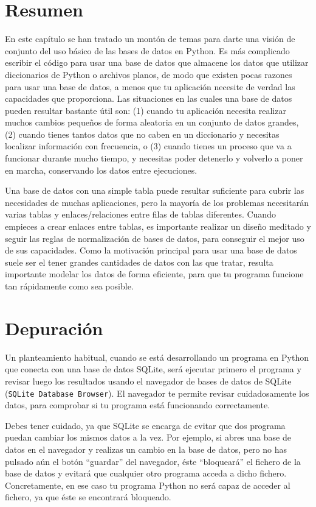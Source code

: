 \section{Resumen}

En este capítulo se han tratado un montón de temas para darte una visión de conjunto del uso básico
de las bases de datos en Python. Es más complicado escribir el código para usar una base
de datos que almacene los datos que utilizar diccionarios de Python o archivos planos, de modo que
existen pocas razones para usar una base de datos, a menos que tu aplicación necesite de verdad
las capacidades que proporciona. Las situaciones en las cuales una base de datos pueden resultar
bastante útil son:
(1) cuando tu aplicación necesita realizar muchos cambios pequeños de forma aleatoria en un conjunto
de datos grandes,
(2) cuando tienes tantos datos que no caben en un diccionario y necesitas localizar
información con frecuencia, o
(3) cuando tienes un proceso que va a funcionar durante mucho tiempo, y necesitas poder
detenerlo y volverlo a poner en marcha, conservando los datos entre ejecuciones.

Una base de datos con una simple tabla puede resultar suficiente para cubrir las necesidades de
muchas aplicaciones, pero la mayoría de los problemas necesitarán varias tablas y enlaces/relaciones
entre filas de tablas diferentes. Cuando empieces a crear enlaces entre tablas,
es importante realizar un diseño meditado y seguir las
reglas de normalización de bases de datos, para conseguir el mejor uso de sus capacidades.
Como la motivación principal para usar una base de datos
suele ser el tener grandes cantidades de datos con las que tratar, resulta importante
modelar los datos de forma eficiente, para que tu programa funcione tan rápidamente como sea
posible. 

\section{Depuración}

Un planteamiento habitual, cuando se está desarrollando un programa en Python que conecta con
una base de datos SQLite, será ejecutar primero el programa y revisar luego los
resultados usando el navegador de bases de datos de SQLite ({\tt SQLite Database Browser}). El
navegador te permite revisar cuidadosamente los datos, para comprobar si tu programa está funcionando
correctamente.

Debes tener cuidado, ya que SQLite se encarga de evitar que dos programa puedan
cambiar los mismos datos a la vez. Por ejemplo, si abres
una base de datos en el navegador y realizas un cambio en la base de datos,
pero no has pulsado aún el botón ``guardar'' del navegador, éste
``bloqueará'' el fichero de la base de datos y evitará que cualquier otro programa
acceda a dicho fichero. Concretamente, en ese caso tu programa Python
no será capaz de acceder al fichero, ya que éste se encontrará bloqueado.


